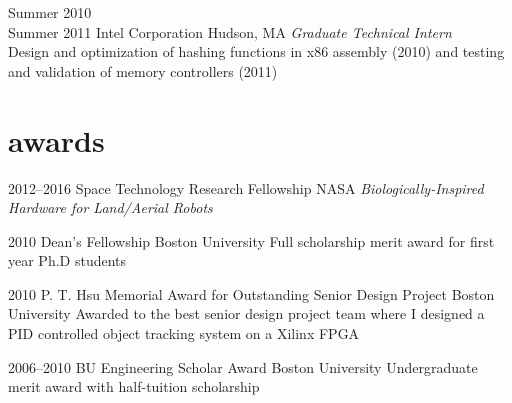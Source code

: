 \documentclass[]{friggeri-cv} %
\begin{document}
\begin{entrylist}


\entry
{Summer 2010\\Summer 2011}
{Intel Corporation}
{Hudson, MA}
{\emph{Graduate Technical Intern} \\
  Design and optimization of hashing functions in x86 assembly (2010) and testing and validation of memory controllers (2011)
}


\end{entrylist}


\section{awards}

\begin{entrylist}


\entry
{2012--2016}
{Space Technology Research Fellowship}
{NASA}
{\emph{Biologically-Inspired Hardware for Land/Aerial Robots}}

\entry
{2010}
{Dean's Fellowship}
{Boston University}
{Full scholarship merit award for first year Ph.D students}

\entry
{2010}
{P. T. Hsu Memorial Award for Outstanding Senior Design Project}
{Boston University}
{Awarded to the best senior design project team where I designed a PID controlled object tracking system on a Xilinx FPGA}

\entry
{2006--2010}
{BU Engineering Scholar Award}
{Boston University}
{Undergraduate merit award with half-tuition scholarship}


\end{entrylist}


\end{document}
